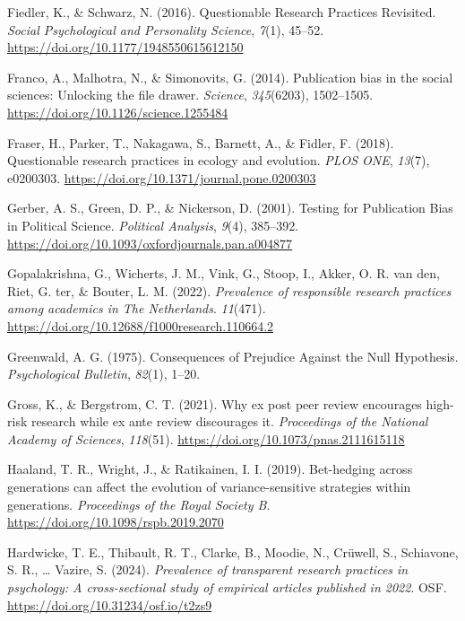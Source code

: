 \documentclass[
  ,man,mask,floatsintext]{apa6}
\newlength{\cslhangindent}
\newlength{\cslentryspacingunit} %
\newenvironment{CSLReferences}[2] %
 {%
  \setlength{\parindent}{0pt}
  \ifodd #1
  \let\oldpar\par
  \def\par{\hangindent=\cslhangindent\oldpar}
  \fi
  \setlength{\parskip}{#2\cslentryspacingunit}
 }%
 {}
\begin{document}
\begin{CSLReferences}{1}{0}
\leavevmode{}%
Fiedler, K., \& Schwarz, N. (2016). Questionable {Research Practices Revisited}. \emph{Social Psychological and Personality Science}, \emph{7}(1), 45--52. \url{https://doi.org/10.1177/1948550615612150}

\leavevmode{}%
Franco, A., Malhotra, N., \& Simonovits, G. (2014). Publication bias in the social sciences: {Unlocking} the file drawer. \emph{Science}, \emph{345}(6203), 1502--1505. \url{https://doi.org/10.1126/science.1255484}

\leavevmode{}%
Fraser, H., Parker, T., Nakagawa, S., Barnett, A., \& Fidler, F. (2018). Questionable research practices in ecology and evolution. \emph{PLOS ONE}, \emph{13}(7), e0200303. \url{https://doi.org/10.1371/journal.pone.0200303}

\leavevmode{}%
Gerber, A. S., Green, D. P., \& Nickerson, D. (2001). Testing for {Publication Bias} in {Political Science}. \emph{Political Analysis}, \emph{9}(4), 385--392. \url{https://doi.org/10.1093/oxfordjournals.pan.a004877}

\leavevmode{}%
Gopalakrishna, G., Wicherts, J. M., Vink, G., Stoop, I., Akker, O. R. van den, Riet, G. ter, \& Bouter, L. M. (2022). \emph{Prevalence of responsible research practices among academics in {The Netherlands}}. \emph{11}(471). \url{https://doi.org/10.12688/f1000research.110664.2}

\leavevmode{}%
Greenwald, A. G. (1975). Consequences of {Prejudice Against} the {Null Hypothesis}. \emph{Psychological Bulletin}, \emph{82}(1), 1--20.

\leavevmode{}%
Gross, K., \& Bergstrom, C. T. (2021). Why ex post peer review encourages high-risk research while ex ante review discourages it. \emph{Proceedings of the National Academy of Sciences}, \emph{118}(51). \url{https://doi.org/10.1073/pnas.2111615118}

\leavevmode{}%
Haaland, T. R., Wright, J., \& Ratikainen, I. I. (2019). Bet-hedging across generations can affect the evolution of variance-sensitive strategies within generations. \emph{Proceedings of the Royal Society B}. \url{https://doi.org/10.1098/rspb.2019.2070}

\leavevmode{}%
Hardwicke, T. E., Thibault, R. T., Clarke, B., Moodie, N., Crüwell, S., Schiavone, S. R., \ldots{} Vazire, S. (2024). \emph{Prevalence of transparent research practices in psychology: {A} cross-sectional study of empirical articles published in 2022}. OSF. \url{https://doi.org/10.31234/osf.io/t2zs9}


\end{CSLReferences}
\end{document}
